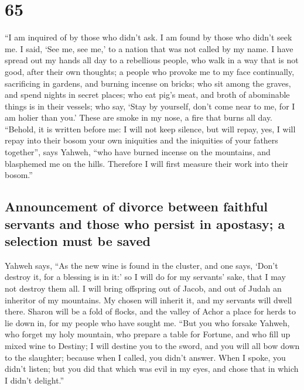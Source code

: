 \hypertarget{section-64}{%
\section{65}\label{section-64}}

 ``I am inquired of by those who didn't ask. I am found by
those who didn't seek me. I said, `See me, see me,' to a nation that was
not called by my name.  I have spread out my hands all day
to a rebellious people, who walk in a way that is not good, after their
own thoughts;  a people who provoke me to my face
continually, sacrificing in gardens, and burning incense on bricks;
 who sit among the graves, and spend nights in secret
places; who eat pig's meat, and broth of abominable things is in their
vessels;  who say, `Stay by yourself, don't come near to
me, for I am holier than you.' These are smoke in my nose, a fire that
burns all day.  ``Behold, it is written before me: I will
not keep silence, but will repay, yes, I will repay into their bosom
 your own iniquities and the iniquities of your fathers
together'', says Yahweh, ``who have burned incense on the mountains, and
blasphemed me on the hills. Therefore I will first measure their work
into their bosom.''

\hypertarget{announcement-of-divorce-between-faithful-servants-and-those-who-persist-in-apostasy-a-selection-must-be-saved}{%
\subsection{Announcement of divorce between faithful servants and those
who persist in apostasy; a selection must be
saved}\label{announcement-of-divorce-between-faithful-servants-and-those-who-persist-in-apostasy-a-selection-must-be-saved}}

 Yahweh says, ``As the new wine is found in the cluster,
and one says, `Don't destroy it, for a blessing is in it:' so I will do
for my servants' sake, that I may not destroy them all.  I
will bring offspring out of Jacob, and out of Judah an inheritor of my
mountains. My chosen will inherit it, and my servants will dwell there.
 Sharon will be a fold of flocks, and the valley of Achor
a place for herds to lie down in, for my people who have sought me.
 ``But you who forsake Yahweh, who forget my holy
mountain, who prepare a table for Fortune, and who fill up mixed wine to
Destiny;  I will destine you to the sword, and you will
all bow down to the slaughter; because when I called, you didn't answer.
When I spoke, you didn't listen; but you did that which was evil in my
eyes, and chose that in which I didn't delight.''

